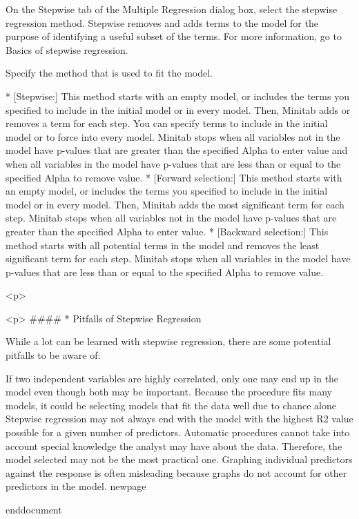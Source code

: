 
On the Stepwise tab of the Multiple Regression dialog box, select the stepwise regression method.
Stepwise removes and adds terms to the model for the purpose of identifying a useful subset of the terms. For more information, go to Basics of stepwise regression.

Specify the method that is used to fit the model.
 
	        * [Stepwise:] This method starts with an empty model, or includes the terms you specified to include in the initial model or in every model. Then, Minitab adds or removes a term for each step. You can specify terms to include in the initial model or to force into every model. Minitab stops when all variables not in the model have p-values that are greater than the specified Alpha to enter value and when all variables in the model have p-values that are less than or equal to the specified Alpha to remove value.
	        * [Forward selection:] This method starts with an empty model, or includes the terms you specified to include in the initial model or in every model. Then, Minitab adds the most significant term for each step. Minitab stops when all variables not in the model have p-values that are greater than the specified Alpha to enter value.
	        * [Backward selection:] This method starts with all potential terms in the model and removes the least significant term for each step. Minitab stops when all variables in the model have p-values that are less than or equal to the specified Alpha to remove value.


<p>


<p>
####        * {Pitfalls of Stepwise Regression}

While a lot can be learned with stepwise regression, there are some potential pitfalls to be aware of:

If two independent variables are highly correlated, only one may end up in the model even though both may be important.
Because the procedure fits many models, it could be selecting models that fit the data well due to chance alone
Stepwise regression may not always end with the model with the highest R2 value possible for a given number of predictors.
Automatic procedures cannot take into account special knowledge the analyst may have about the data. Therefore, the model selected may not be the most practical one.
Graphing individual predictors against the response is often misleading because graphs do not account for other predictors in the model.
newpage



end{document}
